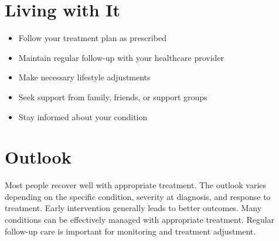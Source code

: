 \section{Living with It}
\begin{itemize}[noitemsep]
  \item Follow your treatment plan as prescribed
  \item Maintain regular follow-up with your healthcare provider
  \item Make necessary lifestyle adjustments
  \item Seek support from family, friends, or support groups
  \item Stay informed about your condition
\end{itemize}
\section{Outlook}
Most people recover well with appropriate treatment. The outlook varies depending on the specific condition, severity at diagnosis, and response to treatment. Early intervention generally leads to better outcomes. Many conditions can be effectively managed with appropriate treatment. Regular follow-up care is important for monitoring and treatment adjustment.
